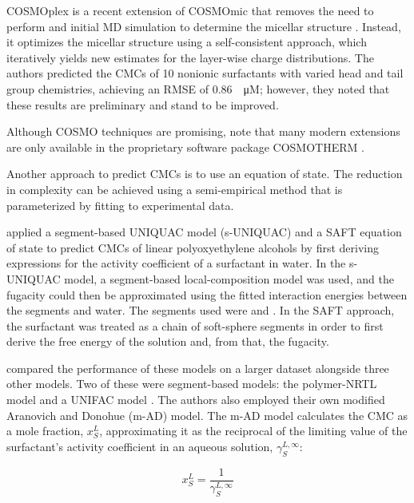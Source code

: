 COSMOplex is a recent extension of COSMOmic that removes the need to perform and
initial MD simulation to determine the micellar structure
\cite{klamtCOSMOplexSelfconsistentSimulation2019}. Instead, it optimizes the
micellar structure using a self-consistent approach, which iteratively yields
new estimates for the layer-wise charge distributions. The authors predicted the
CMCs of 10 nonionic surfactants with varied head and tail group chemistries,
achieving an RMSE of \SI{0.86}{\log \micro M}; however, they noted that these
results are preliminary and stand to be improved.

Although COSMO techniques are promising,
\citet{herbertDielectricContinuumMethods2021} note that many modern extensions
are only available in the proprietary software package \textsc{COSMOTHERM}
\cite{eckertFastSolventScreening2002}.

Another approach to predict CMCs is to use an equation of state. The reduction
in complexity can be achieved using a semi-empirical method that is
parameterized by fitting to experimental data.

\citet{liStudiesUNIQUACSAFT1998} applied a segment-based UNIQUAC model
(s-UNIQUAC) and a SAFT equation of state to predict CMCs of linear
polyoxyethylene alcohols by first deriving expressions for the activity
coefficient of a surfactant in water. In the s-UNIQUAC model, a segment-based
local-composition model was used, and the fugacity could then be approximated
using the fitted interaction energies between the segments and water. The
segments used were  and . In the SAFT approach, the
surfactant was treated as a chain of soft-sphere segments in order to first
derive the free energy of the solution and, from that, the fugacity.

\citet{chengCorrelationCriticalMicelle2005} compared the performance of these
models on a larger dataset alongside three other models. Two of these were
segment-based models: the polymer-NRTL model \cite{liStudiesUNIQUACSAFT1998} and
a UNIFAC model \cite{voutsasPredictionCriticalMicelle2001}. The authors also
employed their own modified Aranovich and Donohue (m-AD) model. The m-AD model
calculates the CMC as a mole fraction, $x_S^L$, approximating it as the
reciprocal of the limiting value of the surfactant's activity coefficient in an
aqueous solution, $\gamma_S^{L,\infty}$:

\begin{equation}
    \label{eq:m-AD}
    x_S^L = \frac{1}{\gamma_S^{L,\infty}}
\end{equation}

